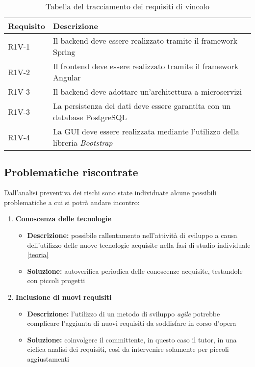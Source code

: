 \begin{longtable}[H]{ll}
    \caption{Tabella del tracciamento dei requisiti di vincolo} \\
    \textbf{Requisito} & \textbf{Descrizione} \\\hline
    R1V-1 & Il backend deve essere realizzato tramite il framework Spring \\\hline
    R1V-2 & Il frontend deve essere realizzato tramite il framework Angular \\\hline
    R1V-3 & Il backend deve adottare un’architettura a microservizi \\\hline
    R1V-3 & La persistenza dei dati deve essere garantita con un database PostgreSQL \\\hline
    R1V-4 & La GUI deve essere realizzata mediante l’utilizzo della libreria \textit{Bootstrap} \\\hline
\end{longtable}

\subsection{Problematiche riscontrate}
Dall'analisi preventiva dei rischi sono state individuate alcune possibili problematiche a cui si potrà andare incontro:
\begin{enumerate}
    \item \textbf{Conoscenza delle tecnologie}
    \begin{itemize}
        \item \textbf{Descrizione:} possibile rallentamento nell'attività di sviluppo a causa dell'utilizzo delle nuove tecnologie acquisite nella fasi di studio individuale \ref{teoria}
        \item \textbf{Soluzione:} autoverifica periodica delle conoscenze acquisite, testandole con piccoli progetti
    \end{itemize}
    \item \textbf{Inclusione di nuovi requisiti}
    \begin{itemize}
        \item \textbf{Descrizione:} l'utilizzo di un metodo di sviluppo \textit{agile} potrebbe complicare l'aggiunta di nuovi requisiti da soddisfare in corso d'opera
        \item \textbf{Soluzione:} coinvolgere il committente, in questo caso il tutor, in una ciclica analisi dei requisiti, così da intervenire solamente per piccoli aggiustamenti
    \end{itemize}
\end{enumerate}

